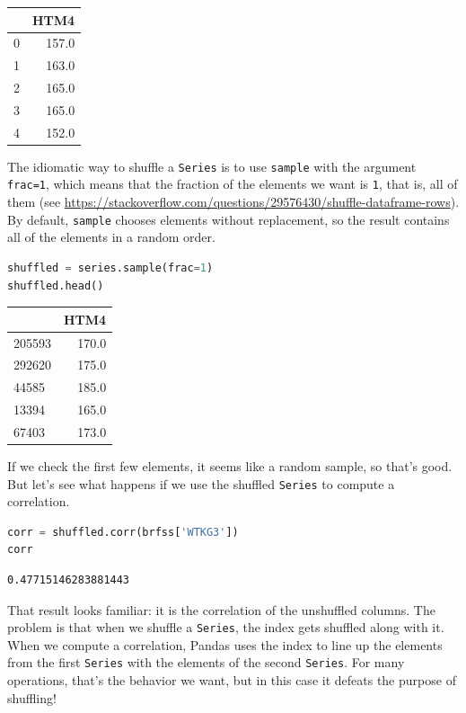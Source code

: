 \begin{tabular}{lr}
\toprule
{} &   HTM4 \\
\midrule
0 &  157.0 \\
1 &  163.0 \\
2 &  165.0 \\
3 &  165.0 \\
4 &  152.0 \\
\bottomrule
\end{tabular}

The idiomatic way to shuffle a \passthrough{\lstinline!Series!} is to
use \passthrough{\lstinline!sample!} with the argument
\passthrough{\lstinline!frac=1!}, which means that the fraction of the
elements we want is \passthrough{\lstinline!1!}, that is, all of them
(see
\url{https://stackoverflow.com/questions/29576430/shuffle-dataframe-rows}).
By default, \passthrough{\lstinline!sample!} chooses elements without
replacement, so the result contains all of the elements in a random
order.

\begin{lstlisting}[language=Python,style=source]
shuffled = series.sample(frac=1)
shuffled.head()
\end{lstlisting}

\begin{tabular}{lr}
\toprule
{} &   HTM4 \\
\midrule
205593 &  170.0 \\
292620 &  175.0 \\
44585  &  185.0 \\
13394  &  165.0 \\
67403  &  173.0 \\
\bottomrule
\end{tabular}

If we check the first few elements, it seems like a random sample, so
that's good. But let's see what happens if we use the shuffled
\passthrough{\lstinline!Series!} to compute a correlation.

\begin{lstlisting}[language=Python,style=source]
corr = shuffled.corr(brfss['WTKG3'])
corr
\end{lstlisting}

\begin{lstlisting}[style=output]
0.47715146283881443
\end{lstlisting}

That result looks familiar: it is the correlation of the unshuffled
columns. The problem is that when we shuffle a
\passthrough{\lstinline!Series!}, the index gets shuffled along with it.
When we compute a correlation, Pandas uses the index to line up the
elements from the first \passthrough{\lstinline!Series!} with the
elements of the second \passthrough{\lstinline!Series!}. For many
operations, that's the behavior we want, but in this case it defeats the
purpose of shuffling!

